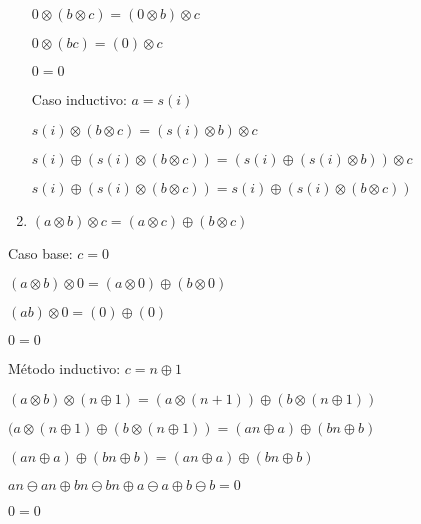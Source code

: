 \documentclass{article}
\begin{document}
\begin{enumerate}
\begin{center}
    $0 \otimes (b \otimes c) = (0 \otimes b) \otimes c$
\end{center}
\begin{center}
    $0 \otimes (bc) = (0) \otimes c$
\end{center}
\begin{center}
    $0 = 0$
\end{center}
\begin{center}
    Caso inductivo: $a = s(i)$
\end{center}
\begin{center}
    $s(i) \otimes (b \otimes c) = (s(i) \otimes b) \otimes c$
\end{center}
\begin{center}
    $s(i) \oplus (s(i) \otimes (b \otimes c)) = (s(i) \oplus (s(i) \otimes b)) \otimes c$
\end{center}
\begin{center}
    $s(i) \oplus (s(i) \otimes (b \otimes c)) = s(i) \oplus (s(i) \otimes (b \otimes c))$
\end{center}
    \item $(a \otimes b) \otimes c = (a \otimes c) \oplus (b \otimes c)$
\end{enumerate}
\begin{center}
    Caso base: $c = 0$
\end{center}
\begin{center}
    $(a \otimes b) \otimes 0 = (a \otimes 0) \oplus (b \otimes 0)$
\end{center}
\begin{center}
    $(ab) \otimes 0 = (0) \oplus (0)$
\end{center}
\begin{center}
    $0 = 0$
\end{center}
\begin{center}
    Método inductivo: $c = n \oplus 1$
\end{center}
\begin{center}
    $(a \otimes b) \otimes (n \oplus 1) = (a \otimes (n + 1)) \oplus (b \otimes (n \oplus 1))$
\end{center}
\begin{center}
    $(a \otimes (n \oplus 1) \oplus (b \otimes (n \oplus 1)) = (an \oplus a) \oplus (bn \oplus b)$
\end{center}
\begin{center}
    $(an \oplus a) \oplus (bn \oplus b) = (an \oplus a) \oplus (bn \oplus b)$
\end{center}
\begin{center}
    $an \ominus an \oplus bn \ominus bn \oplus a \ominus a \oplus b \ominus b = 0$
\end{center}
\begin{center}
    $0 = 0$
\end{center}
\end{document}
